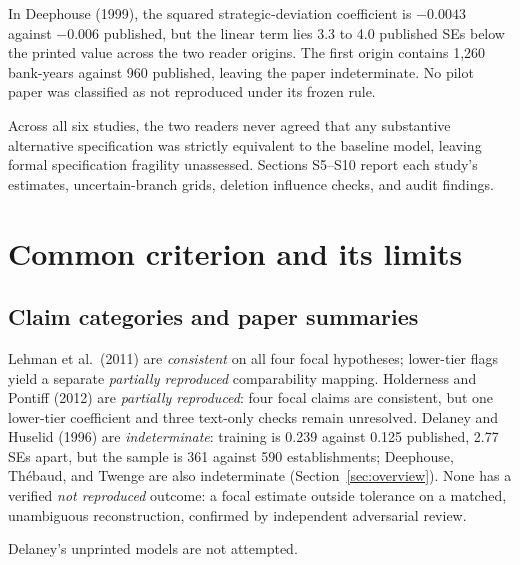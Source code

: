 \documentclass[11pt]{article}
\begin{document}
In Deephouse (1999), the squared strategic-deviation coefficient is $-0.0043$ against $-0.006$ published, but the linear term lies 3.3 to 4.0 published SEs below the printed value across the two reader origins. The first origin contains 1,260 bank-years against 960 published, leaving the paper indeterminate. No pilot paper was classified as not reproduced under its frozen rule.

Across all six studies, the two readers never agreed that any substantive alternative specification was strictly equivalent to the baseline model, leaving formal specification fragility unassessed. Sections S5--S10 report each study's estimates, uncertain-branch grids, deletion influence checks, and audit findings.

\clearpage
\section{Common criterion and its limits}\label{sec:criterion}
\subsection{Claim categories and paper summaries}
Lehman et al.\ (2011) are \textit{consistent} on all four focal hypotheses; lower-tier flags yield a separate \textit{partially reproduced} comparability mapping. Holderness and Pontiff (2012) are \textit{partially reproduced}: four focal claims are consistent, but one lower-tier coefficient and three text-only checks remain unresolved. Delaney and Huselid (1996) are \textit{indeterminate}: training is 0.239 against 0.125 published, 2.77 SEs apart, but the sample is 361 against 590 establishments; Deephouse, Th\'ebaud, and Twenge are also indeterminate (Section~\ref{sec:overview}). None has a verified \textit{not reproduced} outcome: a focal estimate outside tolerance on a matched, unambiguous reconstruction, confirmed by independent adversarial review.

Delaney's unprinted models are not attempted.
\end{document}
